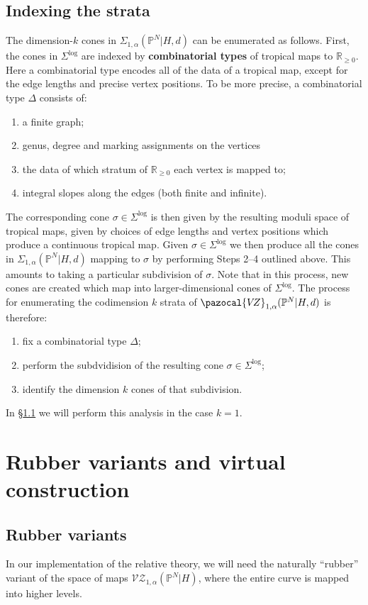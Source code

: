\documentclass[11pt]{amsart}
\newcommand{\PP}{\mathbb P}
\newcommand{\VZ}{\pazocal{V\!Z}}
\newcommand{\RR}{\mathbb{R}}
\theoremstyle{definition}
\theoremstyle{definition}
\begin{document}
\subsection{Indexing the strata} \label{subsection indexing strata} The dimension-$k$ cones in $\Sigma_{1,\alpha}(\PP^N|H,d)$ can be enumerated as follows. First, the cones in $\Sigma^{\operatorname{log}}$ are indexed by \textbf{combinatorial types} of tropical maps to $\RR_{\geq 0}$. Here a combinatorial type encodes all of the data of a tropical map, except for the edge lengths and precise vertex positions. To be more precise, a combinatorial type $\Delta$ consists of:
\begin{enumerate}
\item a finite graph;
\item genus, degree and marking assignments on the vertices
\item the data of which stratum of $\RR_{\geq 0}$ each vertex is mapped to;
\item integral slopes along the edges (both finite and infinite).
\end{enumerate}
The corresponding cone $\sigma \in \Sigma^{\operatorname{log}}$ is then given by the resulting moduli space of tropical maps, given by choices of edge lengths and vertex positions which produce a continuous tropical map. Given $\sigma\in \Sigma^{\operatorname{log}}$ we then produce all the cones in $\Sigma_{1,\alpha}(\PP^N|H,d)$ mapping to $\sigma$ by performing Steps 2--4 outlined above. This amounts to taking a particular subdivision of $\sigma$. Note that in this process, new cones are created which map into larger-dimensional cones of $\Sigma^{\operatorname{log}}$. The process for enumerating the codimension $k$ strata of $\VZ_{1,\alpha}(\PP^N|H,d)$ is therefore:
\begin{enumerate}
\item fix a combinatorial type $\Delta$;
\item perform the subdvidision of the resulting cone $\sigma \in \Sigma^{\operatorname{log}}$;
\item identify the dimension $k$ cones of that subdivision.
\end{enumerate}
In \S \ref{} we will perform this analysis in the case $k=1$.

\section{Rubber variants and virtual construction}

\subsection{Rubber variants} In our implementation of the relative theory, we will need the naturally ``rubber'' variant of the space of maps $
\mathcal{VZ}_{1,\alpha}(\mathbb P^N|H)$, where the entire curve is mapped into higher levels. 
\end{document}
